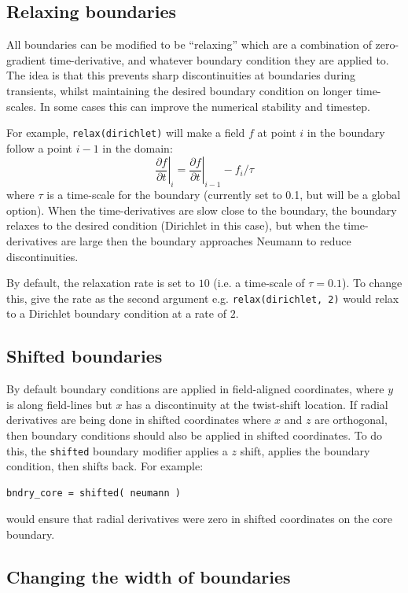 \documentclass[12pt]{article}
\newcommand{\code}[1]{\texttt{#1}}
\newcommand{\deriv}[2]{\ensuremath{\frac{\partial #1}{\partial #2}}}
\begin{document}
\subsection{Relaxing boundaries}

All boundaries can be modified to be ``relaxing'' which are a combination
of zero-gradient time-derivative, and whatever boundary condition they are
applied to. The idea is that this prevents sharp discontinuities at boundaries
during transients, whilst maintaining the desired boundary condition on
longer time-scales. In some cases this can improve the numerical stability
and timestep.

For example, \code{relax(dirichlet)} will make a field $f$ at point $i$ in the
boundary follow a point $i-1$ in the domain:
\[
\left.\deriv{f}{t}\right|_i = \left.\deriv{f}{t}\right|_{i-1}  - f_i / \tau
\]
where $\tau$ is a time-scale for the boundary (currently set to 0.1, but will
be a global option).
When the time-derivatives are slow close to the boundary, the boundary
relaxes to the desired condition (Dirichlet in this case), but when the
time-derivatives are large then the boundary approaches Neumann to reduce
discontinuities.

By default, the relaxation rate is set to $10$ (i.e. a time-scale of
$\tau=0.1$).
To change this, give the rate as the second argument e.g. \code{relax(dirichlet, 2)} would relax to a Dirichlet boundary condition at a rate of $2$.

\subsection{Shifted boundaries}

By default boundary conditions are applied in field-aligned coordinates, where $y$ is along field-lines but
$x$ has a discontinuity at the twist-shift location. If radial derivatives are being done in shifted
coordinates where $x$ and $z$ are orthogonal, then boundary conditions should also be applied in
shifted coordinates. To do this, the \code{shifted} boundary modifier applies a $z$ shift, applies
the boundary condition, then shifts back. For example:
\begin{lstlisting}[numbers=none]
bndry_core = shifted( neumann )
\end{lstlisting}
would ensure that radial derivatives were zero in shifted coordinates on the core boundary.

\subsection{Changing the width of boundaries}
\end{document}
